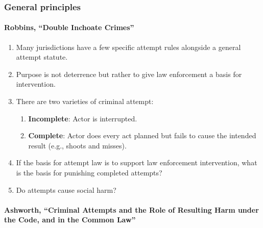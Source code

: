 \subsubsection{General principles}

\paragraph{Robbins, ``Double Inchoate Crimes''}

\begin{enumerate}
    \item Many jurisdictions have a few specific attempt rules alongside a 
    general attempt statute.
    \item Purpose is not deterrence but rather to give law enforcement a basis 
    for intervention.
    \item There are two varieties of criminal attempt:
    \begin{enumerate}
        \item \textbf{Incomplete}: Actor is interrupted.
        \item \textbf{Complete}: Actor does every act planned but fails to 
        cause the intended result (e.g., shoots and misses).
    \end{enumerate}
    \item If the basis for attempt law is to support law enforcement 
    intervention, what is the basis for punishing completed attempts?
    \item Do attempts cause social harm?
\end{enumerate}

\paragraph{Ashworth, ``Criminal Attempts and the Role of Resulting Harm under 
the Code, and in the Common Law''}


